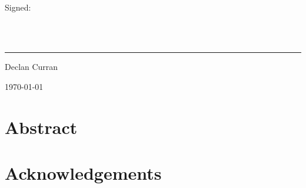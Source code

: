 \documentclass[a4paper, 12pt]{report}
\begin{document}
~\\
Signed:

~\\
~\\
\rule{8cm}{0.4pt}

Declan Curran

\today
\newpage

\chapter*{Abstract}

\chapter*{Acknowledgements}

\setcounter{tocdepth}{2}
\tableofcontents
\listoftables
\listoffigures
\newpage










{}

\newpage

\begin{appendices}
\chapter{}
\end{appendices}
\end{document}
